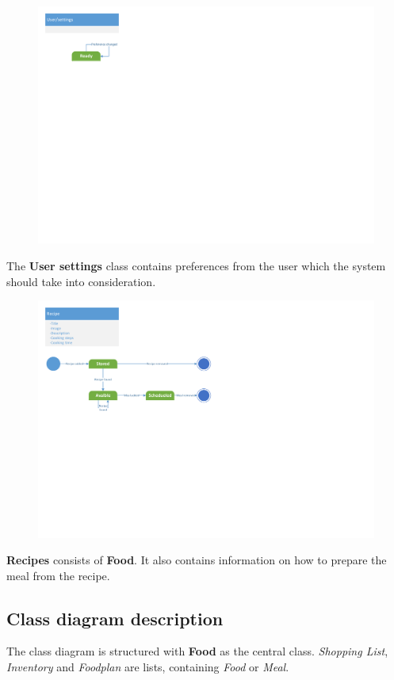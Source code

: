 \begin{figure}[H]
	\centering
	\includegraphics[clip=true, trim=0.5cm 15.5cm 22.5cm 0.5cm]{Development/ProblemDomain/UserSettingsClass.pdf}
	\label{UserSettingsClass}
\end{figure}
The \textbf{User settings} class contains preferences from the user which the system should take into consideration.

\begin{figure}[H]
	\centering
	\includegraphics[clip=true, trim=0.5cm 11cm 14cm 0.5cm]{Development/ProblemDomain/RecipeClass.pdf}
	\label{RecipeClass}
	\end{figure}
\textbf{Recipes} consists of \textbf{Food}. It also contains information on how to prepare the meal from the recipe.

\subsection{Class diagram description}
The class diagram is structured with \textbf{Food} as the central class. 
\textit{Shopping List}, \textit{Inventory} and \textit{Foodplan} are lists, containing \textit{Food} or \textit{Meal}.

